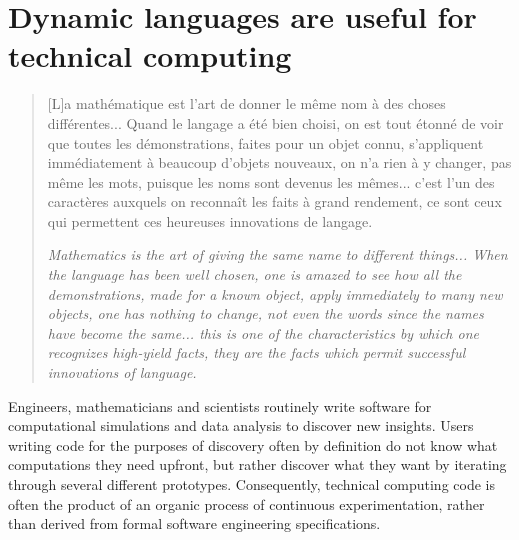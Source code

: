 \documentclass[pldi]{sigplanconf-pldi15}
\begin{document}

\tableofcontents %

\section{Dynamic languages are useful for technical computing}

\begin{quote}
	[L]a math\'ematique est l'art de donner le m\^eme nom \`a des choses
	diff\'erentes... Quand le langage a \'et\'e bien choisi, on est tout \'etonn\'e
	de voir que toutes les d\'emonstrations, faites pour un objet connu,
	s'appliqu\-ent imm\'ediatement \`a beaucoup d'objets nouveaux, on n'a rien \`a
	y changer, pas m\^eme les mots, puisque les noms sont devenus les
	m\^emes... c'est l'un des caract\`eres auxquels on reconna\^it les faits \`a
	grand rendement, ce sont ceux qui permettent ces heureuses
	innovations de langage. \cite{Poincare1908}
	
	\textit{Mathematics is the art of giving the same name to different
	things... When the language has been well chosen, one is amazed to see
	how all the demonstrations, made for a known object, apply immediately
	to many new objects, one has nothing to change, not even the words
	since the names have become the same... this is one of the
	characteristics by which one recognizes high-yield facts, they are the
	facts which permit successful innovations of language.}
\end{quote}

Engineers, mathematicians and scientists routinely write software for
computational simulations and data analysis to discover new insights.
Users writing code for the purposes of discovery often by definition do not
know what computations they need upfront, but rather discover what they want by
iterating through several different prototypes. Consequently, technical
computing code is often the product of an organic process of continuous
experimentation, rather than derived from formal software engineering
specifications.
\end{document}
